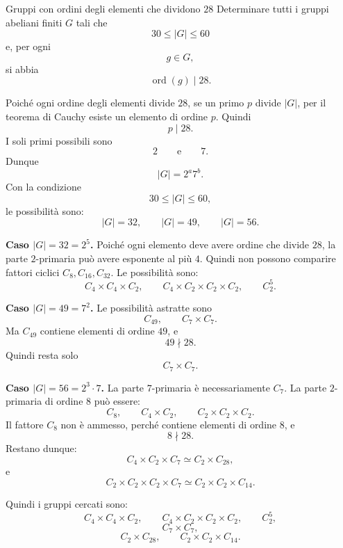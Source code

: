 \documentclass[a4paper]{article}
\begin{document}
\begin{radioactive}
\begin{snippetexercise}{Gruppi con ordini degli elementi che dividono \(28\)}
    Determinare tutti i gruppi abeliani finiti \(G\) tali che
    \[
        30\leq |G|\leq 60
    \]
    e, per ogni
    \[
        g\in G,
    \]
    si abbia
    \[
        \operatorname{ord}(g)\mid 28.
    \]
\end{snippetexercise}
\end{radioactive}

\begin{radioactive}
\begin{snippetsolution}{}
    Poiché ogni ordine degli elementi divide \(28\), se un primo \(p\) divide \(|G|\), per il teorema di Cauchy esiste un elemento di ordine \(p\). Quindi
    \[
        p\mid 28.
    \]
    I soli primi possibili sono
    \[
        2
        \qquad
        \text{e}
        \qquad
        7.
    \]
    Dunque
    \[
        |G|=2^a7^b.
    \]
    Con la condizione
    \[
        30\leq |G|\leq 60,
    \]
    le possibilità sono:
    \[
        |G|=32,
        \qquad
        |G|=49,
        \qquad
        |G|=56.
    \]

    \textbf{Caso \(|G|=32=2^5\).}
    Poiché ogni elemento deve avere ordine che divide \(28\), la parte \(2\)-primaria può avere esponente al più \(4\). Quindi non possono comparire fattori ciclici \(C_8,C_{16},C_{32}\).
    Le possibilità sono:
    \[
        C_4\times C_4\times C_2,
        \qquad
        C_4\times C_2\times C_2\times C_2,
        \qquad
        C_2^5.
    \]

    \textbf{Caso \(|G|=49=7^2\).}
    Le possibilità astratte sono
    \[
        C_{49},
        \qquad
        C_7\times C_7.
    \]
    Ma \(C_{49}\) contiene elementi di ordine \(49\), e
    \[
        49\nmid 28.
    \]
    Quindi resta solo
    \[
        C_7\times C_7.
    \]

    \textbf{Caso \(|G|=56=2^3\cdot 7\).}
    La parte \(7\)-primaria è necessariamente \(C_7\). La parte \(2\)-primaria di ordine \(8\) può essere:
    \[
        C_8,
        \qquad
        C_4\times C_2,
        \qquad
        C_2\times C_2\times C_2.
    \]
    Il fattore \(C_8\) non è ammesso, perché contiene elementi di ordine \(8\), e
    \[
        8\nmid 28.
    \]
    Restano dunque:
    \[
        C_4\times C_2\times C_7
        \simeq
        C_2\times C_{28},
    \]
    e
    \[
        C_2\times C_2\times C_2\times C_7
        \simeq
        C_2\times C_2\times C_{14}.
    \]

    Quindi i gruppi cercati sono:
    \[
        C_4\times C_4\times C_2,
        \qquad
        C_4\times C_2\times C_2\times C_2,
        \qquad
        C_2^5,
    \]
    \[
        C_7\times C_7,
    \]
    \[
        C_2\times C_{28},
        \qquad
        C_2\times C_2\times C_{14}.
    \]
\end{snippetsolution}
\end{radioactive}
\end{document}
